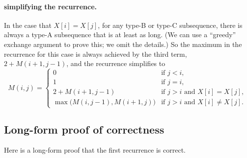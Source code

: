 \paragraph{simplifying the recurrence.}
In the case that $X[i]=X[j]$,
for any type-B or type-C subsequence,
there is always a type-A subsequence that is at least as long.
(We can use a ``greedy'' exchange argument to prove this; we omit the details.)
So the maximum in the recurrence for this case is always
achieved by the third term, $2+M(i+1, j-1)$,
and the recurrence simplifies to
\[
  M(i, j)  =
  \begin{cases}
    0 & \text{if } j < i, \\
    1 & \text{if } j = i, \\
    2 + M(i+1, j-1) & \text{if } j>i \text{ and } X[i] = X[j], \\
    \max\big(M(i, j-1), M(i+1, j)\big) & \text{if } j>i \text{ and } X[i] \ne X[j].
  \end{cases}
\]

\subsection*{Long-form proof of correctness}
Here is a long-form proof that the first recurrence is correct.

